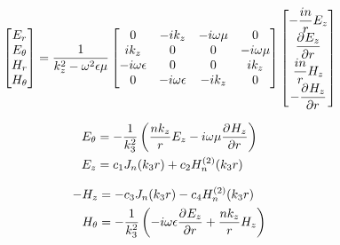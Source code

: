 \begin{equation}
    \begin{bmatrix}
        E_r\\
        E_\theta\\
        H_r\\
        H_\theta
    \end{bmatrix} =
    \frac{1}{k_z^2 - \w^2\eps\mu}
    \begin{bmatrix}
    0 & -ik_z & -i\w\mu & 0 
    \\
    ik_z & 0 & 0 & -i\w\mu
    \\
    -i\w\eps & 0 & 0 & ik_z
    \\
    0 & -i\w\eps & -ik_z & 0
    \end{bmatrix}
    \begin{bmatrix}
        -\frac{in}{r}E_z\\
        \ddr{r}{E_z}\\
        \frac{in}{r}H_z\\
        -\ddr{r}{H_z}
    \end{bmatrix}
\end{equation}

\begin{align}
    E_\theta &= -\frac{1}{k_3^2}\left(\frac{nk_z}{r}E_z - i\w\mu\ddr{r}{H_z}\right)
    \\
    E_z &= c_1 J_n(k_3 r) + c_2 H_n^{(2)}(k_3 r)
\end{align}

\begin{align}
    -H_z &= -c_3 J_n(k_3 r) - c_4 H_n^{(2)}(k_3 r)
    \\
    H_\theta &= -\frac{1}{k_3^2}\left(-i\w\eps\ddr{r}{E_z} + \frac{nk_z}{r}H_z\right)
\end{align}

